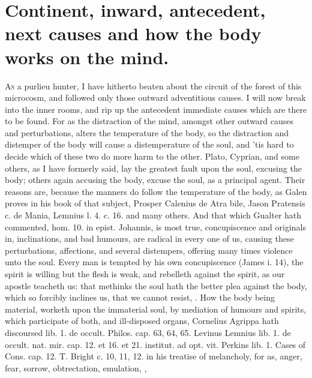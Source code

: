{{%

\section{Continent, inward, antecedent, next causes and how the body works on the mind.}

\lettrine{A}{s} a purlieu hunter, I have hitherto beaten about the circuit of the
forest of this microcosm, and followed only those outward adventitious
causes. I will now break into the inner rooms, and rip up the
antecedent immediate causes which are there to be found. For as the
distraction of the mind, amongst other outward causes and
perturbations, alters the temperature of the body, so the distraction
and distemper of the body will cause a distemperature of the soul, and
'tis hard to decide which of these two do more harm to the other.
Plato, Cyprian, and some others, as I have formerly said, lay the
greatest fault upon the soul, excusing the body; others again accusing
the body, excuse the soul, as a principal agent. Their reasons are,
because the manners do follow the temperature of the body, as
Galen proves in his book of that subject, Prosper Calenius de Atra
bile, Jason Pratensis c. de Mania, Lemnius l. 4. c. 16. and many
others. And that which Gualter hath commented, hom. 10. in epist.
Johannis, is most true, concupiscence and originals in, inclinations,
and bad humours, are radical in every one of us, causing these
perturbations, affections, and several distempers, offering many times
violence unto the soul. Every man is tempted by his own concupiscence
(James i. 14), the spirit is willing but the flesh is weak, and
rebelleth against the spirit, as our apostle teacheth us: that
methinks the soul hath the better plea against the body, which so
forcibly inclines us, that we cannot resist, . How the body being material, worketh upon
the immaterial soul, by mediation of humours and spirits, which
participate of both, and ill-disposed organs, Cornelius Agrippa hath
discoursed lib. 1. de occult. Philos. cap. 63, 64, 65. Levinus Lemnius
lib. 1. de occult. nat. mir. cap. 12. et 16. et 21. institut. ad opt.
vit. Perkins lib. 1. Cases of Cons. cap. 12. T. Bright c. 10, 11, 12.
in his treatise of melancholy, for as,  anger, fear, sorrow,
obtrectation, emulation, \etc{} ,
}}
